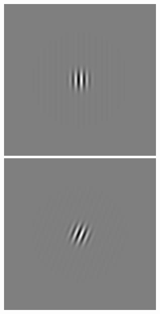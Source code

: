 \begin{figure}[ht]
\begin{center}
 \includegraphics[width=\columnwidth/9]{ch4/figures/rGabor2_0.jpg}
 \includegraphics[width=\columnwidth/9]{ch4/figures/rGabor2_1.jpg}

\end{center}
\end{figure}
